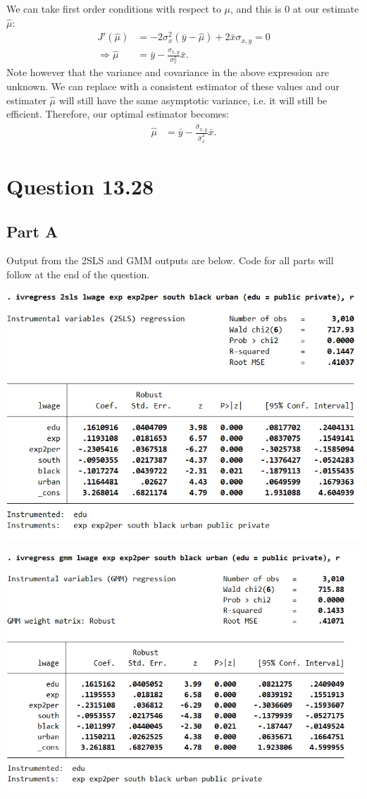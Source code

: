 \documentclass[11pt]{article} %
\begin{document}
We can take first order conditions with respect to $\mu$, and this is $0$ at our estimate $\hat{\mu}$:
\begin{align*}
J'(\hat{\mu}) &= -2\sigma^2_x(\bar{y} - \hat{\mu}) + 2\bar{x}\sigma_{x,y} = 0\\
\Rightarrow \hat{\mu} &= \bar{y} - \frac{\sigma_{x,y}}{\sigma^2_x}\bar{x}.
\end{align*}
Note however that the variance and covariance in the above expression are unknown. We can replace with a consistent estimator of these values and our estimater $\hat{\mu}$ will still have the same asymptotic variance, i.e. it will still be efficient. Therefore, our optimal estimator becomes:
\begin{align*}
\hat{\mu}  &= \bar{y} - \frac{\hat{\sigma}_{x,y}}{\hat{\sigma}^2_x}\bar{x}.
\end{align*}
\section{Question 13.28}
\subsection{Part A}
Output from the 2SLS and GMM outputs are below. Code for all parts will follow at the end of the question. 

\includegraphics{p1}

\includegraphics{p2}
\end{document}
